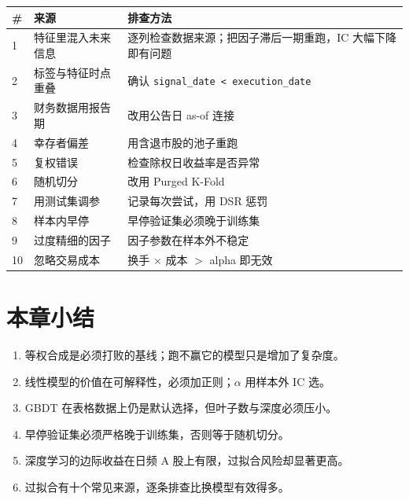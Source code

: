 \begin{center}
\begin{longtable}{@{}p{}p{}p{}@{}}
\toprule
\# & \textbf{来源} & \textbf{排查方法} \\
\midrule
\endhead
1 & 特征里混入未来信息 & 逐列检查数据来源；把因子滞后一期重跑，IC 大幅下降即有问题 \\
2 & 标签与特征时点重叠 & 确认 \texttt{signal\_date < execution\_date} \\
3 & 财务数据用报告期 & 改用公告日 as-of 连接 \\
4 & 幸存者偏差 & 用含退市股的池子重跑 \\
5 & 复权错误 & 检查除权日收益率是否异常 \\
6 & 随机切分 & 改用 Purged K-Fold \\
7 & 用测试集调参 & 记录每次尝试，用 DSR 惩罚 \\
8 & 样本内早停 & 早停验证集必须晚于训练集 \\
9 & 过度精细的因子 & 因子参数在样本外不稳定 \\
10 & 忽略交易成本 & 换手 $\times$ 成本 $>$ alpha 即无效 \\
\bottomrule
\end{longtable}
\end{center}

\section{本章小结}

\begin{enumerate}
  \item 等权合成是必须打败的基线；跑不赢它的模型只是增加了复杂度。
  \item 线性模型的价值在可解释性，必须加正则；$\alpha$ 用样本外 IC 选。
  \item GBDT 在表格数据上仍是默认选择，但叶子数与深度必须压小。
  \item 早停验证集必须严格晚于训练集，否则等于随机切分。
  \item 深度学习的边际收益在日频 A 股上有限，过拟合风险却显著更高。
  \item 过拟合有十个常见来源，逐条排查比换模型有效得多。
\end{enumerate}
